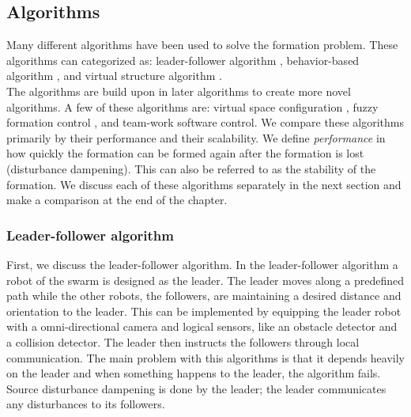 \subsection{Algorithms}
Many different algorithms have been used to solve the formation problem. \cite{chen2005formation,consolini2008leader}
These algorithms can categorized as: leader-follower algorithm \cite{consolini2008leader,das2002vision}, 
behavior-based algorithm \cite{balch1998behavior,lawton2003decentralized}, 
and virtual structure algorithm \cite{ren2004decentralized,do2007nonlinear}. \\
The algorithms are build upon in later algorithms to create more novel algorithms. A few of these algorithms are: 
virtual space configuration \cite{wee2013formation}, 
fuzzy formation control \cite{ranjbar2012novel},
and team-work software control. \cite{kaminka2013use} 
We compare these algorithms primarily by their performance and their scalability. 
We define \emph{performance} in how quickly the formation can be formed again after the formation is lost (disturbance dampening). 
This can also be referred to as the stability of the formation.
We discuss each of these algorithms separately in the next section and make a comparison at the end of the chapter.

\subsubsection{Leader-follower algorithm}
First, we discuss the leader-follower algorithm. 
In the leader-follower algorithm a robot of the swarm is designed as the leader.
The leader moves along a predefined path while the other robots, the followers, are maintaining a desired distance and orientation to the leader. \cite{consolini2008leader}
This can be implemented by equipping the leader robot with a omni-directional camera and logical sensors, like an obstacle detector and a collision detector.
The leader then instructs the followers through local communication. \cite{das2002vision}
The main problem with this algorithms is that it depends heavily on the leader and when something happens to the leader, the algorithm fails. 
Source disturbance dampening is done by the leader; the leader communicates any disturbances to its followers.

